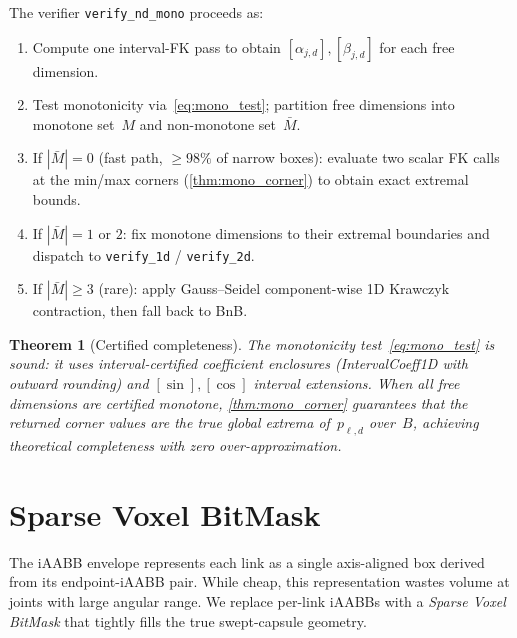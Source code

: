 \documentclass[journal]{IEEEtran}
\newtheorem{theorem}{Theorem}
\begin{document}
The verifier \texttt{verify\_nd\_mono} proceeds as:
\begin{enumerate}
  \item Compute one interval-FK pass to obtain
    $[\alpha_{j,d}], [\beta_{j,d}]$ for each free dimension.
  \item Test monotonicity via~\eqref{eq:mono_test}; partition
    free dimensions into monotone set~$M$ and non-monotone set~$\bar{M}$.
  \item If $|\bar{M}| = 0$ (fast path, $\geq 98\%$ of narrow boxes):
    evaluate two scalar FK calls at the min/max corners
    (\cref{thm:mono_corner}) to obtain exact extremal bounds.
  \item If $|\bar{M}| = 1$ or $2$: fix monotone dimensions to
    their extremal boundaries and dispatch to
    \texttt{verify\_1d} / \texttt{verify\_2d}.
  \item If $|\bar{M}| \geq 3$ (rare): apply Gauss--Seidel
    component-wise 1D Krawczyk contraction, then fall back to BnB.
\end{enumerate}

\begin{theorem}[Certified completeness]\label{thm:cert_complete}
The monotonicity test~\eqref{eq:mono_test} is sound:
it uses interval-certified coefficient enclosures
(IntervalCoeff1D with outward rounding) and
$[\sin],[\cos]$ interval extensions.
When all free dimensions are certified monotone,
\cref{thm:mono_corner} guarantees that the returned
corner values are the true global extrema of~$p_{\ell,d}$
over~$B$, achieving theoretical completeness with
zero over-approximation.
\end{theorem}

\section{Sparse Voxel BitMask}\label{sec:voxel}


The iAABB envelope represents each link as a single
axis-aligned box derived from its endpoint-iAABB pair.
While cheap, this representation wastes volume at joints with
large angular range.
We replace per-link iAABBs with a
\emph{Sparse Voxel BitMask} that tightly fills the true
swept-capsule geometry.
\end{document}
